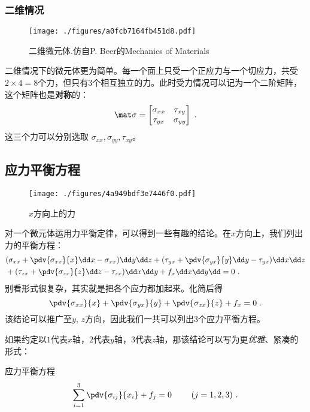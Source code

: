\subsubsection{二维情况}
\begin{figure}[ht]
\centering
\texttt{[image: ./figures/a0fcb7164fb451d8.pdf]}
\caption{二维微元体.仿自P. Beer的Mechanics of Materials} \label{fig_STRESS_2}
\end{figure}

二维情况下的微元体更为简单。每一个面上只受一个正应力与一个切应力，共受$2\times4=8$个力，但只有$3$个相互独立的力。此时受力情况可以记为一个二阶矩阵，这个矩阵也是\textbf{对称}的：
\begin{equation}
\mat \sigma=
\begin{bmatrix}
\sigma_{xx} & \tau_{xy}\\
\tau_{yx} & \sigma_{yy}\\
\end{bmatrix}~.
\end{equation}
这三个力可以分别选取 $\sigma_{xx}, \sigma_{yy}, \tau_{xy}$。

\subsection{应力平衡方程}
\begin{figure}[ht]
\centering
\texttt{[image: ./figures/4a949bdf3e7446f0.pdf]}
\caption{$x$方向上的力} \label{fig_STRESS_7}
\end{figure}
对一个微元体运用力平衡定律，可以得到一些有趣的结论。在$x$方向上，我们列出力的平衡方程：
\begin{equation}
\begin{aligned}
&(\sigma_{xx} + \pdv{\sigma_{xx}}{x} \dd x - \sigma_{xx})\dd y \dd z
+ (\tau_{yx} + \pdv{\sigma_{yx}}{y} \dd y - \tau_{yx}) \dd x \dd z\\
&+ (\tau_{zx} + \pdv{\sigma_{zx}}{z} \dd z - \tau_{zx}) \dd x \dd y 
+ f_x \dd x \dd y \dd = 0~.
\end{aligned}
\end{equation}
别看形式很复杂，其实就是把各个应力都加起来。化简后得
$$
\pdv{\sigma_{xx}}{x} + \pdv{\sigma_{yx}}{y} + \pdv{\sigma_{zx}}{z} + f_x = 0~.
$$
该结论可以推广至$y$, $z$方向，因此我们一共可以列出$3$个应力平衡方程。

如果约定以$1$代表$x$轴，$2$代表$y$轴，$3$代表$z$轴，那该结论可以写为更\textsl{优雅}、紧凑的形式：
\begin{theorem}{应力平衡方程}
$$
\sum_{i=1}^3 \pdv{\sigma_{ij}}{x_i} + f_j=0~ \qquad (j=1,2,3)~.
$$
\end{theorem}

